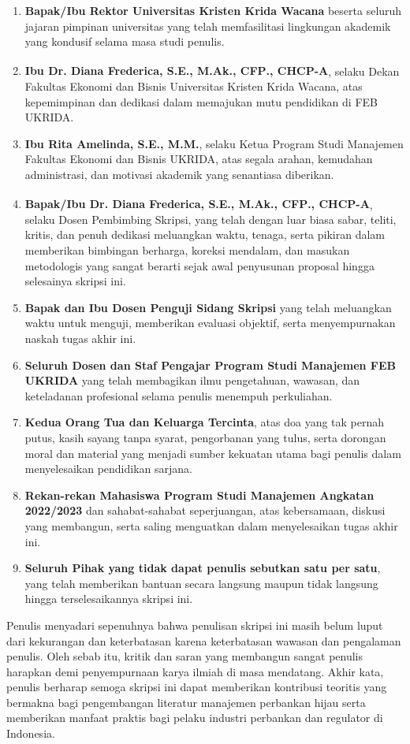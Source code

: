 \documentclass[12pt,a4paper]{article}
\newcommand{\dosbim}{Dr. Diana Frederica, S.E., M.Ak., CFP\textsuperscript{\textregistered}., CHCP-A}
\numberwithin{equation}{section}
\begin{document}
\begin{enumerate}
  \item \textbf{Bapak/Ibu Rektor Universitas Kristen Krida Wacana} beserta seluruh jajaran pimpinan universitas yang telah memfasilitasi lingkungan akademik yang kondusif selama masa studi penulis.
  \item \textbf{Ibu Dr. Diana Frederica, S.E., M.Ak., CFP\textsuperscript{\textregistered}., CHCP-A}, selaku Dekan Fakultas Ekonomi dan Bisnis Universitas Kristen Krida Wacana, atas kepemimpinan dan dedikasi dalam memajukan mutu pendidikan di FEB UKRIDA.
  \item \textbf{Ibu Rita Amelinda, S.E., M.M.}, selaku Ketua Program Studi Manajemen Fakultas Ekonomi dan Bisnis UKRIDA, atas segala arahan, kemudahan administrasi, dan motivasi akademik yang senantiasa diberikan.
  \item \textbf{Bapak/Ibu \dosbim}, selaku Dosen Pembimbing Skripsi, yang telah dengan luar biasa sabar, teliti, kritis, dan penuh dedikasi meluangkan waktu, tenaga, serta pikiran dalam memberikan bimbingan berharga, koreksi mendalam, dan masukan metodologis yang sangat berarti sejak awal penyusunan proposal hingga selesainya skripsi ini.
  \item \textbf{Bapak dan Ibu Dosen Penguji Sidang Skripsi} yang telah meluangkan waktu untuk menguji, memberikan evaluasi objektif, serta menyempurnakan naskah tugas akhir ini.
  \item \textbf{Seluruh Dosen dan Staf Pengajar Program Studi Manajemen FEB UKRIDA} yang telah membagikan ilmu pengetahuan, wawasan, dan keteladanan profesional selama penulis menempuh perkuliahan.
  \item \textbf{Kedua Orang Tua dan Keluarga Tercinta}, atas doa yang tak pernah putus, kasih sayang tanpa syarat, pengorbanan yang tulus, serta dorongan moral dan material yang menjadi sumber kekuatan utama bagi penulis dalam menyelesaikan pendidikan sarjana.
  \item \textbf{Rekan-rekan Mahasiswa Program Studi Manajemen Angkatan 2022/2023} dan sahabat-sahabat seperjuangan, atas kebersamaan, diskusi yang membangun, serta saling menguatkan dalam menyelesaikan tugas akhir ini.
  \item \textbf{Seluruh Pihak yang tidak dapat penulis sebutkan satu per satu}, yang telah memberikan bantuan secara langsung maupun tidak langsung hingga terselesaikannya skripsi ini.
\end{enumerate}

\noindent
Penulis menyadari sepenuhnya bahwa penulisan skripsi ini masih belum luput dari kekurangan dan keterbatasan karena keterbatasan wawasan dan pengalaman penulis. Oleh sebab itu, kritik dan saran yang membangun sangat penulis harapkan demi penyempurnaan karya ilmiah di masa mendatang. Akhir kata, penulis berharap semoga skripsi ini dapat memberikan kontribusi teoritis yang bermakna bagi pengembangan literatur manajemen perbankan hijau serta memberikan manfaat praktis bagi pelaku industri perbankan dan regulator di Indonesia.
\end{document}
